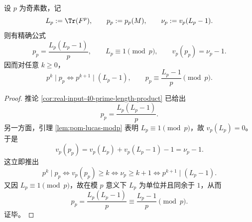 \begin{theorem}\label{thm:conclusion-realinput40-prime-length-lucas-wieferich-valuation}
设 \(p\) 为奇素数，记
\[
L_p:=\Tr(F^p),
\qquad
p_p:=p_p(M),
\qquad
\nu_p:=v_p(L_p-1).
\]
则有精确公式
\[
p_p=\frac{L_p(L_p-1)}{p},
\qquad
L_p\equiv 1 \pmod p,
\qquad
v_p(p_p)=\nu_p-1.
\]
因而对任意 \(k\ge 0\)，
\[
p^k\mid p_p
\iff
p^{k+1}\mid (L_p-1),
\qquad
p_p\equiv \frac{L_p-1}{p}\pmod p.
\]
\end{theorem}
\begin{proof}
推论 \ref{cor:real-input-40-prime-length-product} 已给出
\[
p_p=\frac{L_p(L_p-1)}{p}.
\]
另一方面，引理 \ref{lem:pom-lucas-modp} 表明 \(L_p\equiv 1\pmod p\)，故 \(v_p(L_p)=0\)。于是
\[
v_p(p_p)=v_p(L_p)+v_p(L_p-1)-1=\nu_p-1.
\]
这立即推出
\[
p^k\mid p_p
\iff
v_p(p_p)\ge k
\iff
\nu_p\ge k+1
\iff
p^{k+1}\mid(L_p-1).
\]
又因 \(L_p\equiv 1\pmod p\)，故在模 \(p\) 意义下 \(L_p\) 为单位并且同余于 \(1\)，从而
\[
p_p=\frac{L_p(L_p-1)}{p}\equiv \frac{L_p-1}{p}\pmod p.
\]
证毕。
\end{proof}

